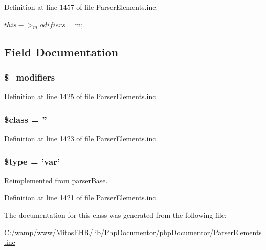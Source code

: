 \-Definition at line 1457 of file \-Parser\-Elements.\-inc.


\begin{DoxyCode}
    {
        $this->_modifiers = $m;
    }
\end{DoxyCode}


\subsection{\-Field \-Documentation}
\hypertarget{classparser_var_aa01f7445669441074fc2d6ccd08eb4a1}{
\subsubsection[{\$\-\_\-modifiers}]{\setlength{\rightskip}{0pt plus 5cm}\$\-\_\-modifiers}}\label{classparser_var_aa01f7445669441074fc2d6ccd08eb4a1}


\-Definition at line 1425 of file \-Parser\-Elements.\-inc.

\hypertarget{classparser_var_a252ba022809910ea710a068fc1bab657}{
\subsubsection[{\$class}]{\setlength{\rightskip}{0pt plus 5cm}\$class = ''}}\label{classparser_var_a252ba022809910ea710a068fc1bab657}


\-Definition at line 1423 of file \-Parser\-Elements.\-inc.

\hypertarget{classparser_var_a9a4a6fba2208984cabb3afacadf33919}{
\subsubsection[{\$type}]{\setlength{\rightskip}{0pt plus 5cm}\$type = 'var'}}\label{classparser_var_a9a4a6fba2208984cabb3afacadf33919}


\-Reimplemented from \hyperlink{classparser_base_a9a4a6fba2208984cabb3afacadf33919}{parser\-Base}.



\-Definition at line 1421 of file \-Parser\-Elements.\-inc.



\-The documentation for this class was generated from the following file\-:\begin{DoxyCompactItemize}
\item 
\-C\-:/wamp/www/\-Mitos\-E\-H\-R/lib/\-Php\-Documentor/php\-Documentor/\hyperlink{_parser_elements_8inc}{\-Parser\-Elements.\-inc}\end{DoxyCompactItemize}
